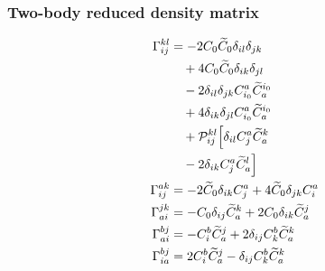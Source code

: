 \subsubsection{Two-body reduced density matrix}
\begin{align*}
\Gamma^{kl}_{ij} &= -  2 C_{0} \widetilde{C}_{0} \delta_{i l} \delta_{j k}  \\
  &\quad  + 4 C_{0} \widetilde{C}_{0} \delta_{i k} \delta_{j l}  \\
  &\quad -  2 \delta_{i l} \delta_{j k} C^{a}_{i_{0}}  \widetilde{C}^{i_{0}}_{a}  \\
  &\quad  + 4 \delta_{i k} \delta_{j l} C^{a}_{i_{0}}  \widetilde{C}^{i_{0}}_{a} \\
  &\quad + \mathcal{P}^{kl}_{ij}\Bigl[ \delta_{i l} C^{a}_{j}  \widetilde{C}^{k}_{a}  \\
  &\quad -  2 \delta_{i k} C^{a}_{j}  \widetilde{C}^{l}_{a} \Bigr] \\
\Gamma^{ak}_{ij} &= -  2 \widetilde{C}_{0} \delta_{i k} C^{a}_{j}   + 4 \widetilde{C}_{0} \delta_{j k} C^{a}_{i} \\
\Gamma^{jk}_{ai} &= -  C_{0} \delta_{i j} \widetilde{C}^{k}_{a}   + 2 C_{0} \delta_{i k} \widetilde{C}^{j}_{a} \\
\Gamma^{bj}_{ai} &= - C^{b}_{i}  \widetilde{C}^{j}_{a}   + 2 \delta_{i j} C^{b}_{k}  \widetilde{C}^{k}_{a} \\
\Gamma^{bj}_{ia} &= 2 C^{b}_{i}  \widetilde{C}^{j}_{a}  -  \delta_{i j} C^{b}_{k}  \widetilde{C}^{k}_{a}
\end{align*}
